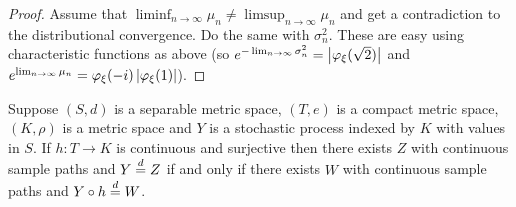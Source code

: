 \begin{proof}
Assume that $\liminf_{n \to \infty} \mu_n \neq \limsup_{n \to \infty} \mu_n$ and get a contradiction to the distributional convergence.  Do the same with $\sigma_n^2$.  These are easy using characteristic functions as above (so $e^{-\lim_{n \to \infty} \sigma_n^2} = \left \vert \varphi_\xi(\sqrt{2}) \right \vert$ and $e^{\lim_{n \to \infty} \mu_n} = \varphi_\xi(-i)  \left \vert \varphi_\xi(1) \right \vert$).
\end{proof}

\begin{thm}\label{PullbackContinuousVersions}Suppose $(S,d)$ is a separable metric space, $(T,e)$ is a compact metric space, $(K,\rho)$ is a metric space and $Y$ is a stochastic process indexed by 
$K$ with values in $S$.  If $h : T \to K$ is continuous and surjective then there exists $Z$ with continuous sample paths and $Y \overset{d}= Z$ if and only if there exists $W$ with continuous sample paths and $Y \circ h \overset{d}= W$.
\end{thm}
